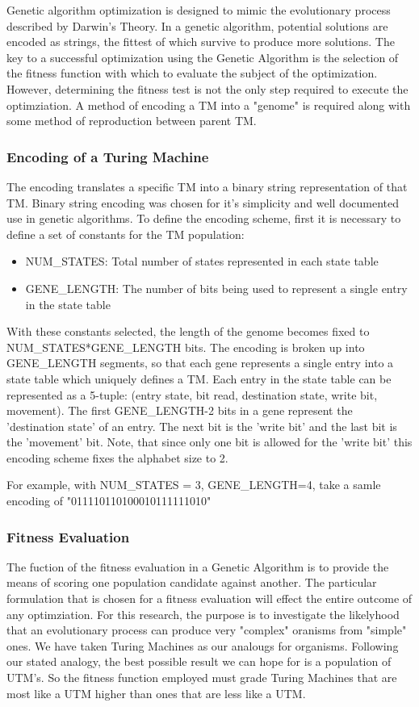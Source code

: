 Genetic algorithm optimization is designed to mimic the evolutionary process described by Darwin's Theory. In a genetic algorithm, potential solutions are encoded as strings, the fittest of which survive to produce more solutions. The key to a successful optimization using the Genetic Algorithm is the selection of the fitness function with which to evaluate the subject of the optimization. However, determining the fitness test is not the only step required to execute the optimziation. A method of encoding a TM into a "genome" is required along with some method of reproduction between parent TM. 

\subsubsection{Encoding of a Turing Machine}
The encoding translates a specific TM into a binary string representation of that TM. Binary string encoding was chosen for it's simplicity and well documented use in genetic algorithms. To define the encoding scheme, first it is necessary to define a set of constants for the TM population:
\begin{itemize}
\item NUM_STATES: Total number of states represented in each state table
\item GENE_LENGTH: The number of bits being used to represent a single entry in the state table
\end{itemize}

With these constants selected, the length of the genome becomes fixed to NUM_STATES*GENE_LENGTH bits. The encoding is broken up into GENE_LENGTH segments, so that each gene represents a single entry into a state table which uniquely defines a TM. Each entry in the state table can be represented as a 5-tuple: (entry state, bit read, destination state, write bit, movement). The first GENE_LENGTH-2 bits in a gene represent the 'destination state' of an entry. The next bit is the 'write bit' and the last bit is the 'movement' bit. Note, that since only one bit is allowed for the 'write bit' this encoding scheme fixes the alphabet size to 2. 

For example, with NUM_STATES = 3, GENE_LENGTH=4, take a samle encoding of "011110110100010111111010"

\subsubsection{Fitness Evaluation}
The fuction of the fitness evaluation in a Genetic Algorithm is to provide the means of scoring one population candidate against another. The particular formulation that is chosen for a fitness evaluation will effect the entire outcome of any optimziation. For this research, the purpose is to investigate the likelyhood that an evolutionary process can produce very "complex" oranisms from "simple" ones. We have taken Turing Machines as our analougs for organisms. Following our stated analogy, the best possible result we can hope for is a population of UTM's. So the fitness function employed must grade Turing Machines that are most like a UTM higher than ones that are less like a UTM.  

